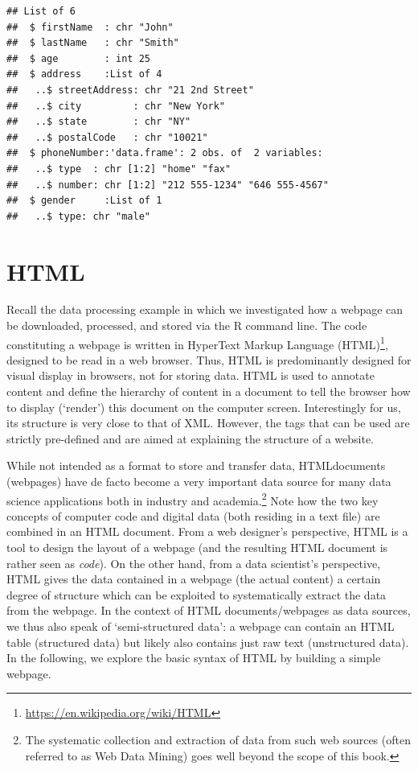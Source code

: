 \documentclass[
  12pt,
]{style/krantz}
\renewcommand{\href}[2]{#2\footnote{\url{#1}}}
\begin{document}
\begin{verbatim}
## List of 6
##  $ firstName  : chr "John"
##  $ lastName   : chr "Smith"
##  $ age        : int 25
##  $ address    :List of 4
##   ..$ streetAddress: chr "21 2nd Street"
##   ..$ city         : chr "New York"
##   ..$ state        : chr "NY"
##   ..$ postalCode   : chr "10021"
##  $ phoneNumber:'data.frame': 2 obs. of  2 variables:
##   ..$ type  : chr [1:2] "home" "fax"
##   ..$ number: chr [1:2] "212 555-1234" "646 555-4567"
##  $ gender     :List of 1
##   ..$ type: chr "male"
\end{verbatim}

\hypertarget{html}{%
\section{HTML}\label{html}}

Recall the data processing example in which we investigated how a webpage can be downloaded, processed, and stored via the R command line. The code constituting a webpage is written in \href{https://en.wikipedia.org/wiki/HTML}{HyperText Markup Language (HTML)}, designed to be read in a web browser. Thus, HTML is predominantly designed for visual display in browsers, not for storing data. HTML is used to annotate content and define the hierarchy of content in a document to tell the browser how to display (`render') this document on the computer screen. Interestingly for us, its structure is very close to that of XML. However, the tags that can be used are strictly pre-defined and are aimed at explaining the structure of a website.

While not intended as a format to store and transfer data, HTMLdocuments (webpages) have de facto become a very important data source for many data science applications both in industry and academia.\footnote{The systematic collection and extraction of data from such web sources (often referred to as Web Data Mining) goes well beyond the scope of this book.} Note how the two key concepts of computer code and digital data (both residing in a text file) are combined in an HTML document. From a web designer's perspective, HTML is a tool to design the layout of a webpage (and the resulting HTML document is rather seen as \emph{code}). On the other hand, from a data scientist's perspective, HTML gives the data contained in a webpage (the actual content) a certain degree of structure which can be exploited to systematically extract the data from the webpage. In the context of HTML documents/webpages as data sources, we thus also speak of `semi-structured data': a webpage can contain an HTML table (structured data) but likely also contains just raw text (unstructured data). In the following, we explore the basic syntax of HTML by building a simple webpage.
\end{document}
